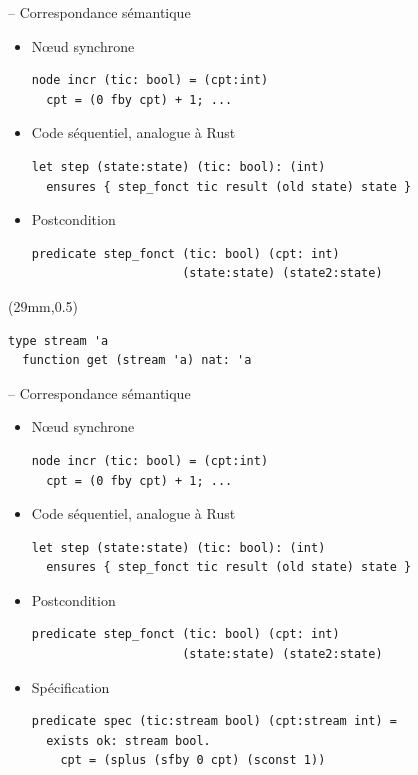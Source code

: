 \documentclass[11pt,usenames,dvipsnames]{beamer}
\begin{document}
\begin{frame}[fragile]{-- Correspondance sémantique}
\begin{itemize}
\item Nœud synchrone
  \begin{lstlisting}[language=minils]
node incr (tic: bool) = (cpt:int)
  cpt = (0 fby cpt) + 1; ...\end{lstlisting}
\item Code séquentiel, analogue à Rust
  \begin{lstlisting}[language=why3]
let step (state:state) (tic: bool): (int)
  ensures { step_fonct tic result (old state) state }\end{lstlisting}
\item Postcondition
  \begin{lstlisting}[language=why3]
predicate step_fonct (tic: bool) (cpt: int)
					 (state:state) (state2:state)\end{lstlisting}
\end{itemize}


\begin{textblock*}{70mm}(29mm,0.5\textheight)
\begin{exampleblock}{}
  \begin{lstlisting}[language=why3]
  type stream 'a
  function get (stream 'a) nat: 'a
\end{lstlisting}
\end{exampleblock}
\end{textblock*}

\end{frame}

\begin{frame}[fragile]{-- Correspondance sémantique}
\begin{itemize}
\item Nœud synchrone
  \begin{lstlisting}[language=minils]
node incr (tic: bool) = (cpt:int)
  cpt = (0 fby cpt) + 1; ...\end{lstlisting}
\item Code séquentiel, analogue à Rust
  \begin{lstlisting}[language=why3]
let step (state:state) (tic: bool): (int)
  ensures { step_fonct tic result (old state) state }\end{lstlisting}
\item Postcondition
  \begin{lstlisting}[language=why3]
predicate step_fonct (tic: bool) (cpt: int)
					 (state:state) (state2:state)\end{lstlisting}
\item Spécification
  \begin{lstlisting}[language=why3]
predicate spec (tic:stream bool) (cpt:stream int) =
  exists ok: stream bool.
    cpt = (splus (sfby 0 cpt) (sconst 1))\end{lstlisting}

\end{itemize}
\end{frame}
\end{document}
